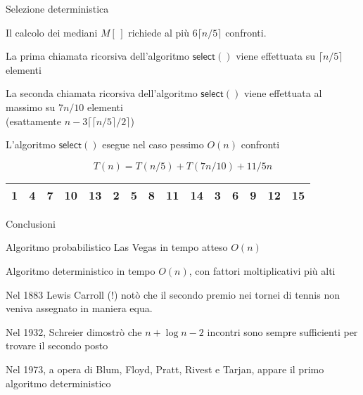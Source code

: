 \begin{frame}{Selezione deterministica}

\vspace{-9pt}
\BIL
\item  Il calcolo dei mediani $M[\,]$ richiede al più $6 \lceil n/5 \rceil$  confronti.
\item La prima chiamata ricorsiva dell'algoritmo $\textsf{select}()$ viene effettuata su $\lceil n/5 \rceil$ elementi
\item La seconda chiamata ricorsiva dell'algoritmo $\textsf{select}()$ viene effettuata al massimo  su $7n/10$ elementi\\
 (esattamente $n - 3 \lceil  \lceil n/5 \rceil /2 \rceil$) 
\item L'algoritmo $\textsf{select}()$ esegue nel caso pessimo $O(n)$ confronti

\[
  T(n) = T(n/5) + T(7n/10) + 11/5n
\]
\EIL

\begin{center}
\begin{tabular}{|c|c|c|c|c||c|c|c|c|c||c|c|c|c|c|}
\hline
\alert{1} & \alert{4} & \alert{\textbf{7}} & 10 & 13 & \alert{2} & \alert{5} & \alert{\textbf{8}} & 11 & 14 & 3 & 6 & \textbf{9} & 12 & 15 \\\hline
\end{tabular}
\end{center}

\end{frame}

\begin{frame}{Conclusioni}

\vspace{-9pt}
\begin{myboxtitle}
\BIL
\item Algoritmo probabilistico Las Vegas in tempo atteso $O(n)$
\item Algoritmo deterministico in tempo $O(n)$, con fattori moltiplicativi
  più alti
\EIL
\end{myboxtitle}


\begin{myboxtitle}
\BIL
\item Nel 1883 Lewis Carroll (!) notò che il secondo premio nei tornei di tennis non veniva assegnato in maniera equa.
\item Nel 1932, Schreier dimostrò che $n + \log n - 2$  incontri sono sempre sufficienti per trovare il secondo posto
\item Nel 1973, a opera di Blum, Floyd, Pratt, Rivest e Tarjan, appare il primo algoritmo deterministico
\EIL
\end{myboxtitle}
\end{frame}







